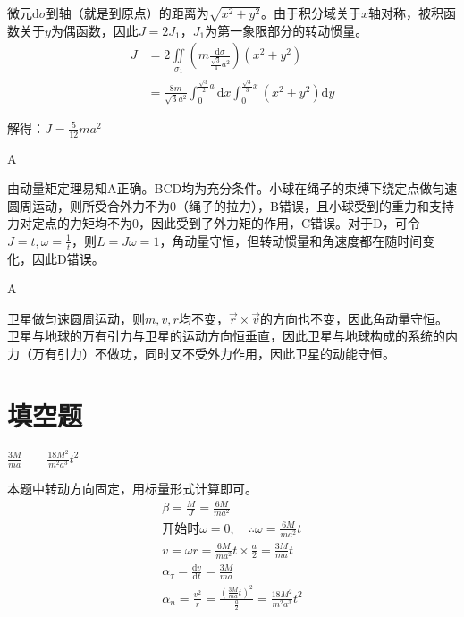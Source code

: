 \documentclass[b5paper,opensource]{qyxf-book}
\newcommand{\di}[1]{\mathrm{d}#1}
\newcommand{\dy}[2]{\frac{\di{#1}}{\di{#2}}}
\newcommand{\zbj}[4]
{
	\draw (0,0) node[below left] {$ O $};
	\draw [->] (#1,0) -- (#2,0) node[right] {$ x $};
	\draw [->] (0,#3) -- (0,#4) node[right] {$ y $};
}
\begin{document}
\par
微元$ \di{\sigma} $到轴（就是到原点）的距离为$ \sqrt{x^2+y^2} $。由于积分域关于$ x $轴对称，被积函数关于$ y $为偶函数，因此$ J=2J_1 $，$ J_1 $为第一象限部分的转动惯量。
\begin{align*}
J&=2\iint\limits_{\sigma_1}\left(m\frac{\di{\sigma}}{\frac{\sqrt{3}}{4}a^2}\right)(x^2+y^2)\\
&=\frac{8m}{\sqrt{3}a^2}\int_0^{\frac{\sqrt{3}}{2}a}\di{x}\int_0^{\frac{\sqrt{3}}{3}x}(x^2+y^2)\di{y}
\end{align*}\par
解得：$ J=\frac{5}{12}ma^2 $

A

由动量矩定理易知A正确。BCD均为充分条件。小球在绳子的束缚下绕定点做匀速圆周运动，则所受合外力不为0（绳子的拉力），B错误，且小球受到的重力和支持力对定点的力矩均不为0，因此受到了外力矩的作用，C错误。对于D，可令$ J=t,\omega=\frac{1}{t} $，则$ L=J\omega=1 $，角动量守恒，但转动惯量和角速度都在随时间变化，因此D错误。
			
A

卫星做匀速圆周运动，则$ m,v,r $均不变，$ \vec{r}\times\vec{v} $的方向也不变，因此角动量守恒。卫星与地球的万有引力与卫星的运动方向恒垂直，因此卫星与地球构成的系统的内力（万有引力）不做功，同时又不受外力作用，因此卫星的动能守恒。

\section{填空题}
$\frac{3M}{ma} \hspace{2em} \frac{18M^2}{m^2a^3}t^2$

本题中转动方向固定，用标量形式计算即可。
\begin{gather*}
\beta=\frac{M}{J}=\frac{6M}{ma^2}\\
\text{开始时}\omega=0,\quad\therefore \omega=\frac{6M}{ma^2}t\\
v=\omega r=\frac{6M}{ma^2}t\times\frac{a}{2}=\frac{3M}{ma}t\\
\alpha_{\tau}=\dy{v}{t}=\frac{3M}{ma}\\
\alpha_n=\frac{v^2}{r}=\frac{\left(\frac{3M}{ma}t\right)^2}{\frac{a}{2}}=\frac{18M^2}{m^2a^3}t^2
\end{gather*}
\end{document}
